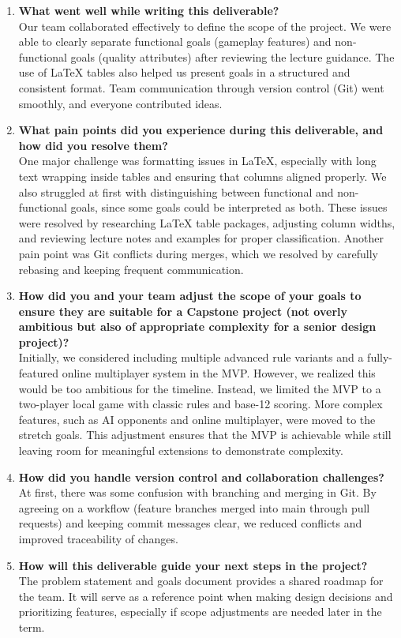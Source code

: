 \documentclass{article}
\begin{document}
    \begin{enumerate}
        \item \textbf{What went well while writing this deliverable?} \\
        Our team collaborated effectively to define the scope of the project. We were able to clearly separate functional goals (gameplay features) and non-functional goals (quality attributes) after reviewing the lecture guidance. The use of LaTeX tables also helped us present goals in a structured and consistent format. Team communication through version control (Git) went smoothly, and everyone contributed ideas.

        \item \textbf{What pain points did you experience during this deliverable, and how did you resolve them?} \\
        One major challenge was formatting issues in LaTeX, especially with long text wrapping inside tables and ensuring that columns aligned properly. We also struggled at first with distinguishing between functional and non-functional goals, since some goals could be interpreted as both. These issues were resolved by researching LaTeX table packages, adjusting column widths, and reviewing lecture notes and examples for proper classification. Another pain point was Git conflicts during merges, which we resolved by carefully rebasing and keeping frequent communication.

        \item \textbf{How did you and your team adjust the scope of your goals to ensure they are suitable for a Capstone project (not overly ambitious but also of appropriate complexity for a senior design project)?} \\
        Initially, we considered including multiple advanced rule variants and a fully-featured online multiplayer system in the MVP. However, we realized this would be too ambitious for the timeline. Instead, we limited the MVP to a two-player local game with classic rules and base-12 scoring. More complex features, such as AI opponents and online multiplayer, were moved to the stretch goals. This adjustment ensures that the MVP is achievable while still leaving room for meaningful extensions to demonstrate complexity.

        \item \textbf{How did you handle version control and collaboration challenges?} \\
        At first, there was some confusion with branching and merging in Git. By agreeing on a workflow (feature branches merged into main through pull requests) and keeping commit messages clear, we reduced conflicts and improved traceability of changes.

        \item \textbf{How will this deliverable guide your next steps in the project?} \\
        The problem statement and goals document provides a shared roadmap for the team. It will serve as a reference point when making design decisions and prioritizing features, especially if scope adjustments are needed later in the term.
    \end{enumerate}
\end{document}
